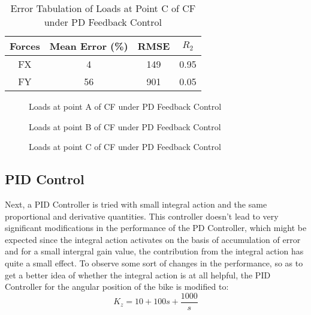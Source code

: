 \begin{table}[h!]
	\centering
	\begin{tabular}{ |c|c|c|c| } 
		\hline
		Forces & Mean Error (\%) & RMSE & $R_2$\\ 
		\hline
		FX & 4&149&0.95\\ 
		FY & 56&901&0.05 \\ 
		\hline
	\end{tabular}
	\caption{Error Tabulation of Loads at Point C of CF under PD Feedback Control}
	\label{tab:pureFeedbkPDC}
\end{table}

\begin{figure}[h!]
    \centering
    \scalebox{0.8}{
    \begin{tikzpicture}
        
    \end{tikzpicture}}
    \caption{Loads at point A of CF under PD Feedback Control}
    \label{fig:pureFeedbkPDA}
\end{figure}

\begin{figure}[h!]
    \centering
    \scalebox{0.8}{
    \begin{tikzpicture}
        
    \end{tikzpicture}}
    \caption{Loads at point B of CF under PD Feedback Control}
    \label{fig:pureFeedbkPDB}
\end{figure}

\begin{figure}[h!]
    \centering
    \scalebox{0.8}{
    \begin{tikzpicture}
            
    \end{tikzpicture}}
    \caption{Loads at point C of CF under PD Feedback Control}
    \label{fig:pureFeedbkPDC}
\end{figure}


\subsection*{PID Control}
Next, a PID Controller is tried with small integral action and the same proportional and derivative quantities. This controller doesn't lead to very significant modifications in the performance of the PD Controller, which might be expected since the integral action activates on the basis of accumulation of error and for a small intergral gain value, the contribution from the integral action has quite a small effect. To observe some sort of changes in the performance, so as to get a better idea of whether the integral action is at all helpful, the PID Controller for the angular position of the bike is modified to:
$$K_z = 10 + 100s + \frac{1000}{s}$$

